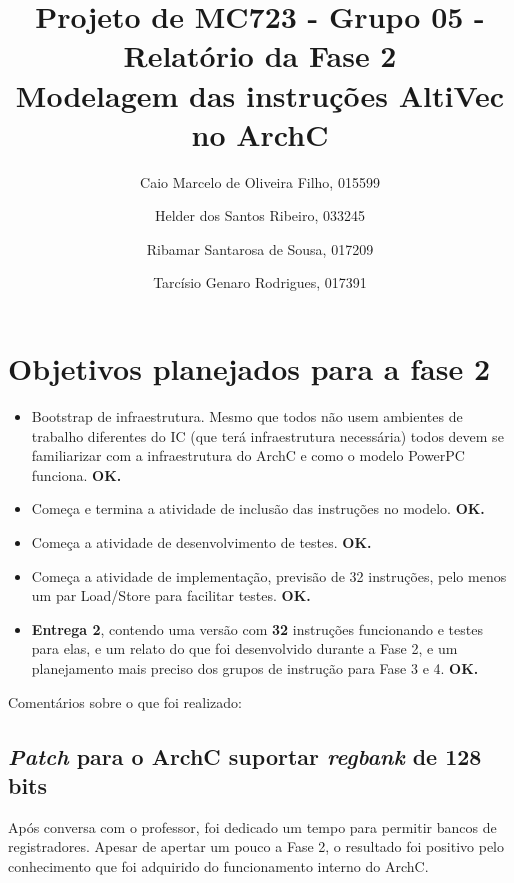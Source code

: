 \documentclass[twocolumn]{article}
\newcommand{\tech}[1]{\textit{#1}}
\begin{document}
\title{Projeto de MC723 - Grupo 05 - Relatório da Fase 2\\ Modelagem das instruções AltiVec no ArchC}
\author{
Caio Marcelo de Oliveira Filho, 015599 \and
Helder dos Santos Ribeiro, 033245 \and
Ribamar Santarosa de Sousa, 017209 \and 
Tarcísio Genaro Rodrigues, 017391
}

\date{}
\maketitle

\section{Objetivos planejados para a fase 2}

\begin{itemize}

\item Bootstrap de infraestrutura. Mesmo que todos não usem ambientes de
trabalho diferentes do IC (que terá infraestrutura necessária) todos devem se
familiarizar com a infraestrutura do ArchC e como o modelo PowerPC funciona.
\textbf{OK.}

\item Começa e termina a atividade de inclusão das instruções no modelo.
\textbf{OK.}

\item Começa a atividade de desenvolvimento de testes. \textbf{OK.}

\item Começa a atividade de implementação, previsão de 32 instruções, pelo
menos um par Load/Store para facilitar testes. \textbf{OK.}

\item \textbf{Entrega 2}, contendo uma versão com \textbf{32}
instruções funcionando e testes para elas, e um relato do que foi desenvolvido
durante a Fase 2, e um planejamento mais preciso dos grupos de instrução para
Fase 3 e 4. \textbf{OK.}

\end{itemize}

Comentários sobre o que foi realizado:


\subsection{\tech{Patch} para o ArchC suportar \tech{regbank} de 128 bits}

Após conversa com o professor, foi dedicado um tempo para permitir bancos de
registradores. Apesar de apertar um pouco a Fase 2, o resultado foi positivo
pelo conhecimento que foi adquirido do funcionamento interno do ArchC.
\end{document}
